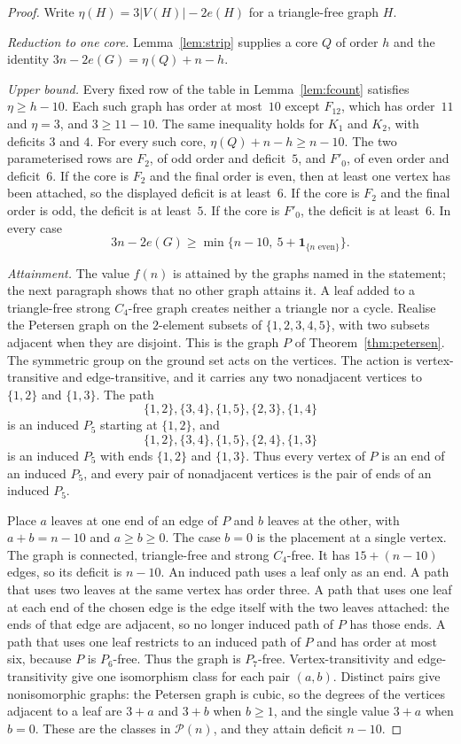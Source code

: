 \documentclass[ASNA]{USG}
\theoremstyle{WBstyletwo}
\numberwithin{equation}{section}
\begin{document}
\begin{proof}
Write $\eta(H)=3|V(H)|-2e(H)$ for a triangle-free graph $H$.

\emph{Reduction to one core.}
Lemma~\ref{lem:strip} supplies a core $Q$ of order $h$ and the identity $3n-2e(G)=\eta(Q)+n-h$.

\emph{Upper bound.}
Every fixed row of the table in Lemma~\ref{lem:fcount} satisfies $\eta\ge h-10$. Each such graph has order at most~$10$ except $F_{12}$, which has order~$11$ and $\eta=3$, and $3\ge 11-10$. The same inequality holds for $K_1$ and $K_2$, with deficits $3$ and $4$. For every such core, $\eta(Q)+n-h\ge n-10$. The two parameterised rows are $F_2$, of odd order and deficit~$5$, and $F'_0$, of even order and deficit~$6$. If the core is $F_2$ and the final order is even, then at least one vertex has been attached, so the displayed deficit is at least~$6$. If the core is $F_2$ and the final order is odd, the deficit is at least~$5$. If the core is $F'_0$, the deficit is at least~$6$. In every case
\[
3n-2e(G)\ge\min\bigl\{n-10,\ 5+\mathbf{1}_{\{n\text{ even}\}}\bigr\}.
\]

\emph{Attainment.}
The value $f(n)$ is attained by the graphs named in the statement; the next paragraph shows that no other graph attains it. A leaf added to a triangle-free strong $C_4$-free graph creates neither a triangle nor a cycle. Realise the Petersen graph on the $2$-element subsets of $\{1,2,3,4,5\}$, with two subsets adjacent when they are disjoint. This is the graph $P$ of Theorem~\ref{thm:petersen}. The symmetric group on the ground set acts on the vertices. The action is vertex-transitive and edge-transitive, and it carries any two nonadjacent vertices to $\{1,2\}$ and $\{1,3\}$. The path
\[
\{1,2\},\{3,4\},\{1,5\},\{2,3\},\{1,4\}
\]
is an induced $P_5$ starting at $\{1,2\}$, and
\[
\{1,2\},\{3,4\},\{1,5\},\{2,4\},\{1,3\}
\]
is an induced $P_5$ with ends $\{1,2\}$ and $\{1,3\}$. Thus every vertex of $P$ is an end of an induced $P_5$, and every pair of nonadjacent vertices is the pair of ends of an induced $P_5$.

Place $a$ leaves at one end of an edge of $P$ and $b$ leaves at the other, with $a+b=n-10$ and $a\ge b\ge 0$. The case $b=0$ is the placement at a single vertex. The graph is connected, triangle-free and strong $C_4$-free. It has $15+(n-10)$ edges, so its deficit is $n-10$. An induced path uses a leaf only as an end. A path that uses two leaves at the same vertex has order three. A path that uses one leaf at each end of the chosen edge is the edge itself with the two leaves attached: the ends of that edge are adjacent, so no longer induced path of $P$ has those ends. A path that uses one leaf restricts to an induced path of $P$ and has order at most six, because $P$ is $P_6$-free. Thus the graph is $P_7$-free. Vertex-transitivity and edge-transitivity give one isomorphism class for each pair $(a,b)$. Distinct pairs give nonisomorphic graphs: the Petersen graph is cubic, so the degrees of the vertices adjacent to a leaf are $3+a$ and $3+b$ when $b\ge 1$, and the single value $3+a$ when $b=0$. These are the classes in $\mathcal P(n)$, and they attain deficit $n-10$.


\end{proof}
\end{document}
